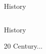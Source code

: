 \documentclass[10pt]{beamer}
\begin{document}
{\begin{frame}{History}
\begin{columns}
\begin{column}{0.16\textwidth}
        \end{column}
    \end{columns}
\end{frame}
}

{

\begin{frame}{History}
    \begin{center}
        \Huge{20 Century...}
    \end{center}
\end{frame}

}
\end{document}
